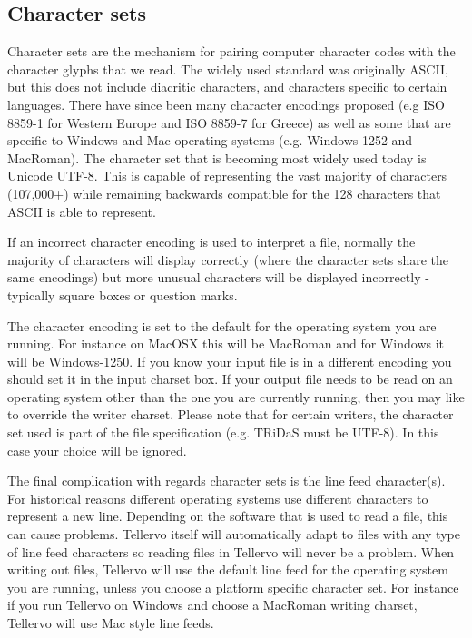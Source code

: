 \subsection{Character sets}
\label{txt:characterSets}
Character sets are the
mechanism for pairing computer character codes with the character glyphs that we read. The widely
used standard was originally ASCII, but this does not include diacritic characters, and characters specific
to certain languages. There have since been many character encodings proposed (e.g ISO 8859-1 for
Western Europe and ISO 8859-7 for Greece) as well as some that are specific to Windows and Mac
operating systems (e.g. Windows-1252 and MacRoman). The character set that is becoming most widely
used today is Unicode UTF-8. This is capable of representing the vast majority of characters (107,000+) while remaining
backwards compatible for the 128 characters that ASCII is able to represent.

If an incorrect character encoding is used to interpret a file, normally the majority of characters will display
correctly (where the character sets share the same encodings) but more unusual characters will be displayed
incorrectly - typically square boxes or question marks.

The character encoding is set to the default for the operating system you are running. For instance on
MacOSX this will be MacRoman and for Windows it will be Windows-1250. If you know your input file
is in a different encoding you should set it in the input charset box. If your output file needs to be read
on an operating system other than the one you are currently running, then you may like to override the
writer charset. Please note that for certain writers, the character set used is part of the file specification
(e.g. TRiDaS must be UTF-8). In this case your choice will be ignored.

The final complication with regards character sets is the line feed character(s). For historical reasons
different operating systems use different characters to represent a new line. Depending on the software
that is used to read a file, this can cause problems. Tellervo itself will automatically adapt to files with
any type of line feed characters so reading files in Tellervo will never be a problem. When writing
out files, Tellervo will use the default line feed for the operating system you are running, unless you
choose a platform specific character set. For instance if you run Tellervo on Windows and choose a
MacRoman writing charset, Tellervo will use Mac style line feeds.

